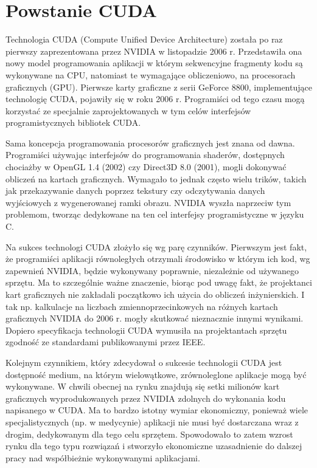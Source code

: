 \section{Powstanie CUDA}

Technologia CUDA (Compute Unified Device Architecture) została po raz pierwszy
zaprezentowana przez NVIDIA w listopadzie 2006 r. Przedstawiła ona nowy model
programowania aplikacji w którym sekwencyjne fragmenty kodu są wykonywane na
CPU, natomiast te wymagające obliczeniowo, na procesorach graficznych (GPU).
Pierwsze karty graficzne z serii GeForce 8800, implementujące technologię CUDA,
		 pojawiły się w roku 2006 r. Programiści od tego czasu mogą korzystać ze
		 specjalnie zaprojektowanych w tym celów interfejsów programistycznych
		 bibliotek CUDA.

Sama koncepcja programowania procesorów graficznych jest znana od dawna.
Programiści używając interfejsów do programowania shaderów, dostępnych chociażby
w OpenGL 1.4 (2002) czy Direct3D 8.0 (2001), mogli dokonywać 
obliczeń na kartach graficznych. Wymagało to jednak często wielu trików, takich
jak przekazywanie danych poprzez tekstury czy odczytywania danych wyjściowych z
wygenerowanej ramki obrazu. NVIDIA wyszła naprzeciw tym problemom, tworząc
dedykowane na ten cel interfejsy programistyczne w języku C.

Na sukces technologi CUDA złożyło się wg \cite{massive} parę czynników.
Pierwszym jest fakt, że programiści aplikacji równoległych otrzymali środowisko
w którym ich kod, wg zapewnień NVIDIA, będzie wykonywany poprawnie, niezależnie
od używanego sprzętu. Ma to szczególnie ważne znaczenie, biorąc pod uwagę fakt,
   że projektanci kart graficznych nie zakładali początkowo ich użycia do
   obliczeń inżynierskich. I tak np. kalkulacje na liczbach zmiennoprzecinkowych
   na różnych kartach graficznych NVIDIA do 2006 r. mogły skutkować nieznacznie innymi
   wynikami. Dopiero specyfikacja technologii CUDA wymusiła na projektantach
   sprzętu zgodność ze standardami publikowanymi przez IEEE.

Kolejnym czynnikiem, który zdecydował o sukcesie technologii CUDA jest
dostępność medium, na którym wielowątkowe, zrównoleglone aplikacje mogą być
wykonywane. W chwili obecnej na rynku znajdują się setki milionów kart
graficznych wyprodukowanych przez NVIDIA zdolnych do wykonania kodu napisanego w
CUDA. Ma to bardzo istotny wymiar ekonomiczny, ponieważ wiele specjalistycznych
(np. w medycynie) aplikacji nie musi być dostarczana wraz z drogim,
	dedykowanym dla tego celu sprzętem. Spowodowało to zatem wzrost rynku dla
	tego typu rozwiązań i stworzyło ekonomiczne uzasadnienie do dalszej pracy
	nad współbieżnie wykonywanymi aplikacjami.

